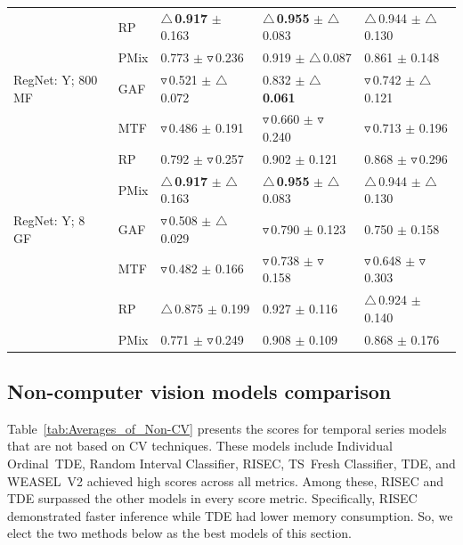 \documentclass[final,3p,times,twocolumn]{elsarticle}
\newcommand{\purpole}[1]{\textcolor[rgb]{0.7,0.2,0.7}{#1}}
\begin{document}
\begin{table}[t!]
{\begin{tabular}{lllll}
 & RP & \textbf{$\triangle$\,0.917} $\pm$ 0.163 & \textbf{$\triangle$\,0.955} $\pm$ $\triangle$\,0.083 & $\triangle$\,0.944 $\pm$ $\triangle$\,0.130 \\
 & \purpole{PMix} & 0.773 $\pm$ $\triangledown$\,0.236 & 0.919 $\pm$ $\triangle$\,0.087 & 0.861 $\pm$ 0.148 \\
RegNet: Y; 800 MF & GAF & $\triangledown$\,0.521 $\pm$ $\triangle$\,0.072 & 0.832 $\pm$ \textbf{$\triangle$\,0.061} & $\triangledown$\,0.742 $\pm$ $\triangle$\,0.121 \\
 & MTF & $\triangledown$\,0.486 $\pm$ 0.191 & $\triangledown$\,0.660 $\pm$ $\triangledown$\,0.240 & $\triangledown$\,0.713 $\pm$ 0.196 \\
 & RP & 0.792 $\pm$ $\triangledown$\,0.257 & 0.902 $\pm$ 0.121 & 0.868 $\pm$ $\triangledown$\,0.296 \\
 & \purpole{PMix} & \textbf{$\triangle$\,0.917} $\pm$ $\triangle$\,0.163 & \textbf{$\triangle$\,0.955} $\pm$ $\triangle$\,0.083 & $\triangle$\,0.944 $\pm$ $\triangle$\,0.130 \\
RegNet: Y; 8 GF & GAF & $\triangledown$\,0.508 $\pm$ $\triangle$\,0.029 & $\triangledown$\,0.790 $\pm$ 0.123 & 0.750 $\pm$ 0.158 \\
 & MTF & $\triangledown$\,0.482 $\pm$ 0.166 & $\triangledown$\,0.738 $\pm$ $\triangledown$\,0.158 & $\triangledown$\,0.648 $\pm$ $\triangledown$\,0.303 \\
 & RP & $\triangle$\,0.875 $\pm$ 0.199 & 0.927 $\pm$ 0.116 & $\triangle$\,0.924 $\pm$ 0.140 \\
 & \purpole{PMix} & 0.771 $\pm$ $\triangledown$\,0.249 & 0.908 $\pm$ 0.109 & 0.868 $\pm$ 0.176 \\
\bottomrule
\end{tabular}

    }
\end{table}



\subsection{Non-computer vision models comparison}


Table~\ref{tab:Averages_of_Non-CV} presents the scores for temporal series models that are not based on \gls{CV} techniques. These models include Individual \mbox{Ordinal TDE}, Random Interval Classifier, \gls{RISEC}, \mbox{TS Fresh} Classifier, \gls{TDE}, and \mbox{WEASEL V2} achieved high scores across all metrics. Among these, \gls{RISEC} and \gls{TDE} surpassed the other models in every score metric. 
Specifically, \gls{RISEC} demonstrated faster inference while \gls{TDE} had lower memory consumption. So, we elect the two methods below as the best models of this section.
\end{document}
